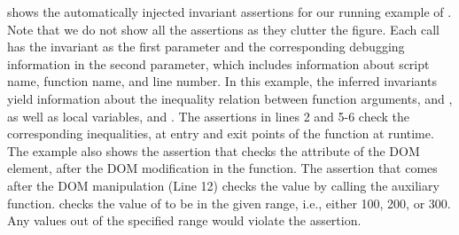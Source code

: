  shows the automatically injected invariant assertions for our running example of
. Note that we do not show all the assertions as they clutter the figure. Each  call has the invariant as the first parameter and the corresponding debugging information in the second parameter, which includes information about script name, function name, and line number.
In this example, the inferred invariants yield information about the inequality relation between function arguments,  and , as well as local variables,  and . 
The assertions in lines 2 and 5-6 check the corresponding inequalities, at entry and exit points of the  function at runtime. 
The example also shows the assertion that checks the  attribute of the DOM element, after the \javascript DOM modification in the  function. 
The assertion that comes after the DOM manipulation (Line 12) checks the  value by calling the auxiliary  function.  checks the  value of 
to be in the given range, i.e., either 100, 200, or 300. Any values out of the specified range would violate the assertion.


 




